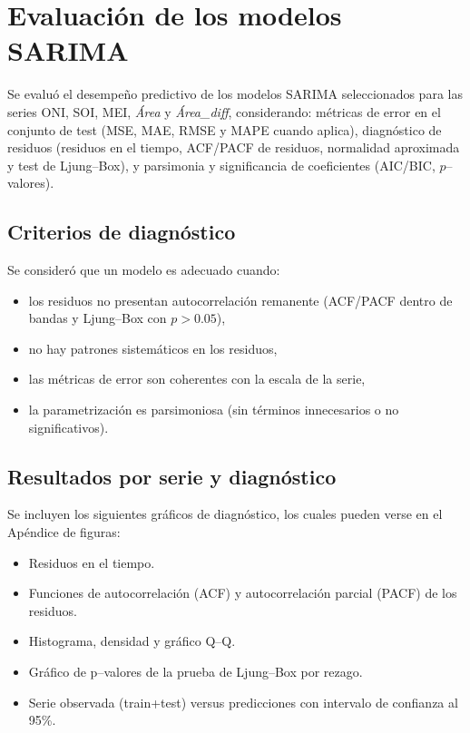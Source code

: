 \section{Evaluación de los modelos SARIMA}

Se evaluó el desempeño predictivo de los modelos SARIMA seleccionados para las series
ONI, SOI, MEI, \emph{Área} y \emph{Área\_diff}, considerando: métricas de error en el
conjunto de test (MSE, MAE, RMSE y MAPE cuando aplica), diagnóstico de residuos
(residuos en el tiempo, ACF/PACF de residuos, normalidad aproximada y test de Ljung--Box),
y parsimonia y significancia de coeficientes (AIC/BIC, $p$--valores).

\subsection{Criterios de diagnóstico}
Se consideró que un modelo es adecuado cuando:
\begin{itemize}
    \item los residuos no presentan autocorrelación remanente (ACF/PACF dentro de bandas y Ljung--Box con $p>0.05$),
    \item no hay patrones sistemáticos en los residuos,
    \item las métricas de error son coherentes con la escala de la serie,
    \item la parametrización es parsimoniosa (sin términos innecesarios o no significativos).
\end{itemize}

\subsection{Resultados por serie y diagnóstico}
Se incluyen los siguientes gráficos de diagnóstico, los cuales pueden verse en el Apéndice de figuras:

\begin{itemize}
    \item Residuos en el tiempo.  
    \item Funciones de autocorrelación (ACF) y autocorrelación parcial (PACF) de los residuos.  
    \item Histograma, densidad y gráfico Q--Q.  
    \item Gráfico de p--valores de la prueba de Ljung--Box por rezago.  
    \item Serie observada (train+test) versus predicciones con intervalo de confianza al 95\%.  
\end{itemize}

